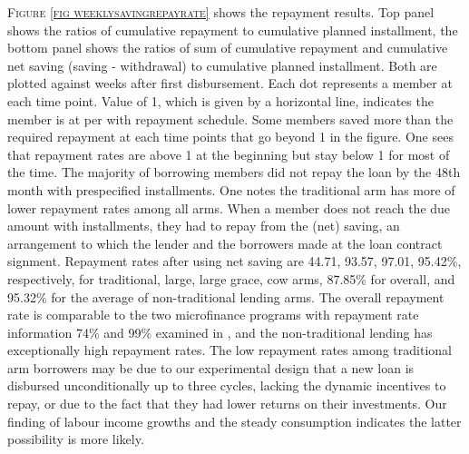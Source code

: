 	\textsc{\footnotesize Figure \ref{fig weeklysavingrepayrate}} shows the repayment results. Top panel shows the ratios of cumulative repayment to cumulative planned installment, the bottom panel shows the ratios of sum of cumulative repayment and cumulative net saving (saving - withdrawal) to cumulative planned installment. Both are plotted against weeks after first disbursement. Each dot represents a member at each time point. Value of 1, which is given by a horizontal line, indicates the member is at per with repayment schedule. Some members saved more than the required repayment at each time points that go beyond 1 in the figure. One sees that repayment rates are above 1 at the beginning but stay below 1 for most of the time. The majority of borrowing members did not repay the loan by the 48th month with prespecified installments. One notes the \textsf{traditional} arm has more of lower repayment rates among all arms. When a member does not reach the due amount with installments, they had to repay from the (net) saving, an arrangement to which the lender and the borrowers made at the loan contract signment. Repayment rates after using net saving are 44.71, 93.57, 97.01, 95.42\%, respectively, for \textsf{traditional, large, large grace, cow} arms, 87.85\% for overall, and 95.32\% for the average of non-\textsf{traditional} lending arms. %
	The overall repayment rate is comparable to the two microfinance programs with repayment rate information 74\% and 99\% examined in \citet{BanerjeeKarlanZinman2015}, and the non-\textsf{traditional} lending has exceptionally high repayment rates. The low repayment rates among \textsf{traditional} arm borrowers may be due to our experimental design that a new loan is disbursed unconditionally up to three cycles, lacking the dynamic incentives to repay, or due to the fact that they had lower returns on their investments. Our finding of labour income growths and the steady consumption indicates the latter possibility is more likely. 

